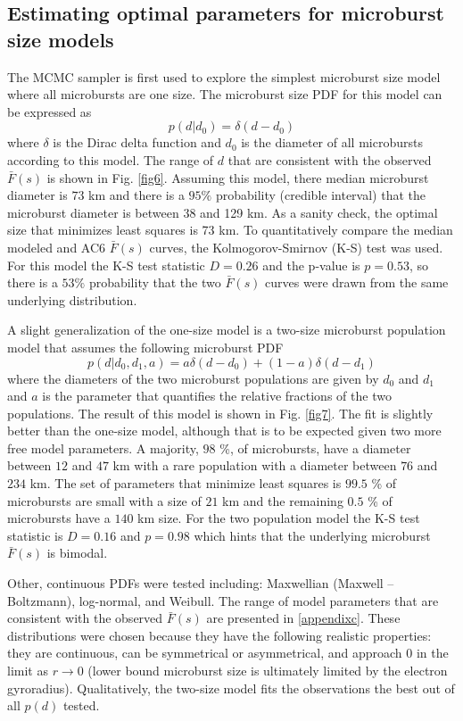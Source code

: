 \documentclass[draft]{agujournal2019}
\begin{document}
\subsection{Estimating optimal parameters for  microburst size models}
The MCMC sampler is first used to explore the simplest  microburst size model where all microbursts are one size. The microburst size PDF for this model can be expressed as
\begin{equation}
p(d | d_0) = \delta(d-d_0)
\end{equation} where $\delta$ is the Dirac delta function and $d_0$ is the diameter of all microbursts according to this model. The range of $d$ that are consistent with the observed $\bar{F}(s)$ is shown in Fig. \ref{fig6}. Assuming this model, there median microburst diameter is $73$ km and there is a $95 \%$ probability (credible interval) that the microburst diameter is between 38 and 129 km. As a sanity check, the optimal size that minimizes least squares is 73 km. To quantitatively compare the median modeled and AC6 $\bar{F}(s)$ curves, the Kolmogorov-Smirnov (K-S) test was used. For this model the K-S test statistic $D = 0.26$ and the p-value is $p = 0.53$, so there is a $53 \% $ probability that the two $\bar{F}(s)$ curves were drawn from the same underlying distribution.

A slight generalization of the one-size model is a two-size microburst population model that assumes the following microburst PDF
\begin{equation}
p(d | d_0, d_1, a) = a \delta(d-d_0) + (1-a)\delta(d-d_1)
\end{equation} where the diameters of the two microburst populations are given by $d_0$ and $d_1$ and $a$ is the parameter that quantifies the relative fractions of the two populations. The result of this model is shown in Fig. \ref{fig7}. The fit is slightly better than the one-size model, although that is to be expected given two more free model parameters. A majority, $98$ \%, of microbursts, have a diameter between $12$ and $47$ km with a rare population with a diameter between $76$ and $234$ km. The set of parameters that minimize least squares is $99.5$ \% of microbursts are small with a size of $21$ km and the remaining $0.5$ \% of microbursts have a $140$ km size. For the two population model the K-S test statistic is $D = 0.16$ and $p = 0.98$ which hints that the underlying microburst $\bar{F}(s)$ is bimodal.


Other, continuous PDFs were tested including: Maxwellian (Maxwell -- Boltzmann), log-normal, and Weibull. The range of model parameters that are consistent with the observed $\bar{F}(s)$ are presented in \ref{appendixc}. These distributions were chosen because they have the following realistic properties: they are continuous, can be symmetrical or asymmetrical, and approach 0 in the limit as $r \rightarrow 0$ (lower bound microburst size is ultimately limited by the electron gyroradius). Qualitatively, the two-size model fits the observations the best out of all $p(d)$ tested.
\end{document}
